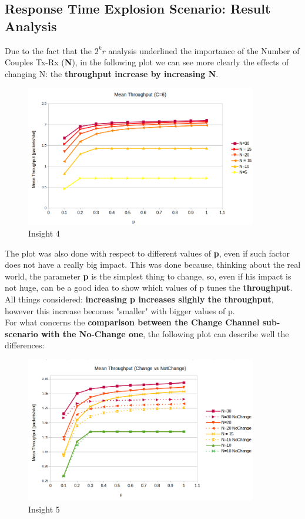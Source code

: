 \subsection{Response Time Explosion Scenario: Result Analysis}
Due to the fact that the $2^{k}r$ analysis underlined the importance of the Number of Couples Tx-Rx (\textbf{N}), in the following plot we can see more clearly the effects of changing N: the \textbf{throughput increase by increasing N}.  
\begin{figure}[H]
	\centering
	\includegraphics[width=0.9\textwidth]{img/MeanThroughputBufferExplosion.png}
	\caption{Insight 4}
	\label{img: insight4}
\end{figure}
The plot was also done with respect to different values of \textbf{p}, even if such factor does not have a really big impact. This was done because, thinking about the real world, the parameter \textbf{p} is the simplest thing to change, so, even if his impact is not huge, can be a good idea to show which values of p tunes the \textbf{throughput}. All things considered: \textbf{increasing p increases slighly the throughput}, however this increase becomes "smaller" with bigger values of p.\\
For what concerns the \textbf{comparison between the Change Channel sub-scenario with the No-Change one}, the following plot can describe well the differences:
\begin{figure}[H]
	\centering
	\includegraphics[width=0.9\textwidth]{img/MeanThroughputBufferExplosionChangeVSNoChange.png}
	\caption{Insight 5}
	\label{img: insight3_respTime}
\end{figure}
